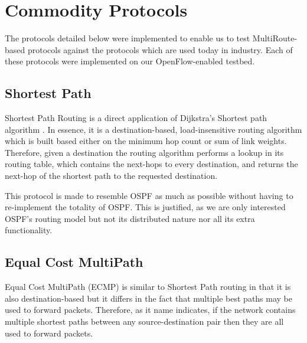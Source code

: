   

\section{Commodity Protocols}

The protocols detailed below were implemented to enable us to test
MultiRoute-based protocols against the protocols which are used today in
industry. Each of these protocols were implemented on our OpenFlow-enabled
testbed.


\subsection{Shortest Path}

Shortest Path Routing is a direct application of Dijkstra's Shortest path
algorithm \cite{DIJK}. In essence, it is a destination-based, load-insensitive
routing algorithm which is built based either on the minimum hop count or sum of
link weights. Therefore, given a destination the routing algorithm performs a
lookup in its routing table, which contains the next-hops to every destination,
and returns the next-hop of the shortest path to the requested destination.

This protocol is made to resemble OSPF \cite{OSPF} as much as possible without
having to re-implement the totality of OSPF. This is justified, as we are only
interested OSPF's routing model but not its distributed nature nor all its
extra functionality.

\subsection{Equal Cost MultiPath}

Equal Cost MultiPath (ECMP) \cite{RFC2991} is similar to Shortest Path routing in
that it is also destination-based but it differs in the fact that multiple best
paths may be used to forward packets. Therefore, as it name indicates, if the
network contains multiple shortest paths between any source-destination pair
then they are all used to forward packets.

